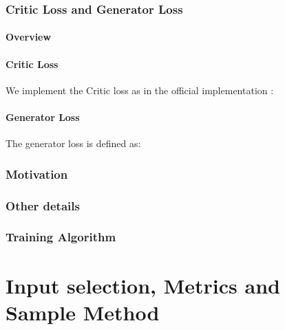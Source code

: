\subsubsection{Critic Loss and Generator Loss}
\paragraph{Overview}
\paragraph{Critic Loss}
We implement the Critic loss as in the  official implementation \cite{wgangp_imple}:



\paragraph{Generator Loss}
The generator loss is defined as:

\subsubsection{Motivation} %
\label{sec:arch_advantages}


\subsubsection{Other details} %

\subsubsection{Training Algorithm}


\section{Input selection, Metrics and Sample Method}
\label{sec:input_metrics_sample}
